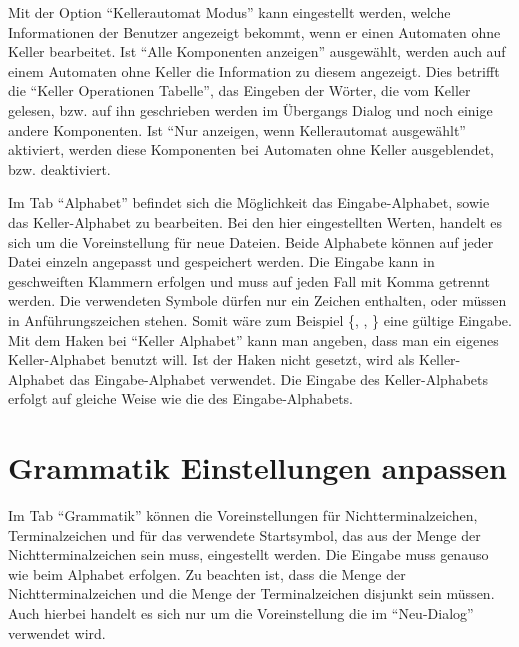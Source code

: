 Mit der Option "`Kellerautomat Modus"' kann eingestellt werden, welche Informationen
der Benutzer angezeigt bekommt, wenn er einen Automaten ohne Keller bearbeitet. Ist
"`Alle Komponenten anzeigen"' ausgewählt, werden auch auf einem Automaten ohne Keller
die Information zu diesem angezeigt. Dies betrifft die "`Keller Operationen Tabelle"',
das Eingeben der Wörter, die vom Keller gelesen, bzw. auf ihn geschrieben
werden im Übergangs Dialog und noch einige andere Komponenten. Ist "`Nur anzeigen, wenn
Kellerautomat ausgewählt"' aktiviert, werden diese Komponenten bei Automaten ohne
Keller ausgeblendet, bzw. deaktiviert.\vspace{10pt}

Im Tab "`Alphabet"' befindet sich die Möglichkeit das Eingabe-Alphabet, sowie das
Keller-Alphabet zu bearbeiten. Bei den hier eingestellten Werten, handelt es sich
um die Voreinstellung für neue Dateien. Beide Alphabete können auf jeder Datei
einzeln angepasst und gespeichert werden. Die Eingabe kann in geschweiften
Klammern erfolgen und muss auf jeden Fall mit Komma getrennt werden. Die
verwendeten Symbole dürfen nur ein Zeichen enthalten, oder müssen in
Anführungszeichen stehen. Somit wäre zum Beispiel \{, , 
\} eine gültige Eingabe. Mit dem Haken bei "`Keller Alphabet"' kann
man angeben, dass man ein eigenes Keller-Alphabet benutzt will. Ist der Haken
nicht gesetzt, wird als Keller-Alphabet das Eingabe-Alphabet verwendet. Die
Eingabe des Keller-Alphabets erfolgt auf gleiche Weise wie die des
Eingabe-Alphabets.


\section{Grammatik Einstellungen anpassen}

Im Tab "`Grammatik"' können die Voreinstellungen für Nichtterminalzeichen,
Terminalzeichen und für das verwendete Startsymbol, das aus der Menge der
Nichtterminalzeichen sein muss, eingestellt werden. Die Eingabe muss genauso wie
beim Alphabet erfolgen. Zu beachten ist, dass die Menge der Nichtterminalzeichen
und die Menge der Terminalzeichen disjunkt sein müssen. Auch hierbei handelt es
sich nur um die Voreinstellung die im "`Neu-Dialog"' verwendet wird.